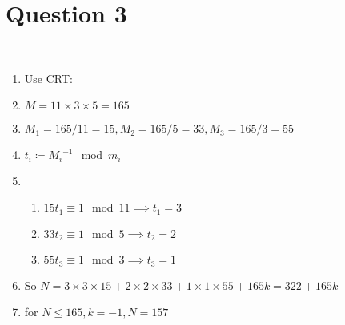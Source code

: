 \documentclass{article}
\begin{document}
\newpage

\section*{Question 3}

~

\begin{enumerate}
    \item Use CRT:
    \item $M=11\times 3\times 5=165$
    \item $M_1=165/11=15,M_2=165/5=33,M_3=165/3=55$
    \item $t_i\coloneqq {M_i}^{-1} \mod{m_i}$
    \item \begin{enumerate}
        \item $15t_1\equiv 1\mod{11}\implies t_1=3$
        \item $33t_2\equiv 1\mod{5}\implies t_2=2$
        \item $55t_3\equiv 1\mod{3}\implies t_3=1$
    \end{enumerate}
    \item So $N=3\times 3\times 15 + 2\times 2\times 33+1\times 1\times 55+165k=322+165k$
    \item for $N\leq 165, k=-1,N=157$
\end{enumerate}
\end{document}
